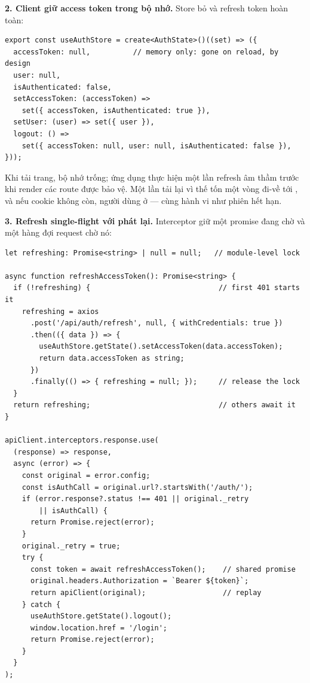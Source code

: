 \textbf{2. Client giữ access token trong bộ nhớ.} Store bỏ
 và refresh token hoàn toàn:

\begin{lstlisting}
export const useAuthStore = create<AuthState>()((set) => ({
  accessToken: null,          // memory only: gone on reload, by design
  user: null,
  isAuthenticated: false,
  setAccessToken: (accessToken) =>
    set({ accessToken, isAuthenticated: true }),
  setUser: (user) => set({ user }),
  logout: () =>
    set({ accessToken: null, user: null, isAuthenticated: false }),
}));
\end{lstlisting}

Khi tải trang, bộ nhớ trống; ứng dụng thực hiện một lần refresh âm
thầm trước khi render các route được bảo vệ. Một lần tải lại vì thế tốn
một vòng đi-về tới , và nếu cookie không còn,
người dùng ở  --- cùng hành vi như phiên hết hạn.

\textbf{3. Refresh single-flight với phát lại.} Interceptor giữ một
promise đang chờ và một hàng đợi request chờ nó:

\begin{lstlisting}
let refreshing: Promise<string> | null = null;   // module-level lock

async function refreshAccessToken(): Promise<string> {
  if (!refreshing) {                              // first 401 starts it
    refreshing = axios
      .post('/api/auth/refresh', null, { withCredentials: true })
      .then(({ data }) => {
        useAuthStore.getState().setAccessToken(data.accessToken);
        return data.accessToken as string;
      })
      .finally(() => { refreshing = null; });     // release the lock
  }
  return refreshing;                              // others await it
}

apiClient.interceptors.response.use(
  (response) => response,
  async (error) => {
    const original = error.config;
    const isAuthCall = original.url?.startsWith('/auth/');
    if (error.response?.status !== 401 || original._retry
        || isAuthCall) {
      return Promise.reject(error);
    }
    original._retry = true;
    try {
      const token = await refreshAccessToken();    // shared promise
      original.headers.Authorization = `Bearer ${token}`;
      return apiClient(original);                  // replay
    } catch {
      useAuthStore.getState().logout();
      window.location.href = '/login';
      return Promise.reject(error);
    }
  }
);
\end{lstlisting}


